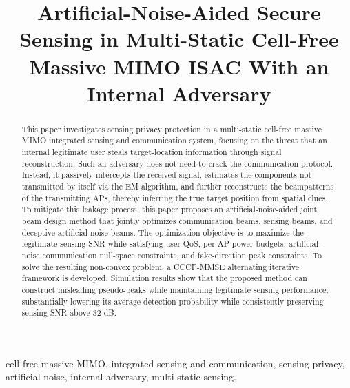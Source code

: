 \documentclass[conference,twocolumn,a4paper]{IEEEtran}
\title{Artificial-Noise-Aided Secure Sensing in Multi-Static Cell-Free Massive MIMO ISAC With an Internal Adversary}
\author{\IEEEauthorblockN{Author information to be inserted \verifytag}}
\begin{document}
\maketitle

\begin{abstract}
This paper investigates sensing privacy protection in a multi-static cell-free massive MIMO integrated sensing and communication system, focusing on the threat that an internal legitimate user steals target-location information through signal reconstruction. Such an adversary does not need to crack the communication protocol. Instead, it passively intercepts the received signal, estimates the components not transmitted by itself via the EM algorithm, and further reconstructs the beampatterns of the transmitting APs, thereby inferring the true target position from spatial clues. To mitigate this leakage process, this paper proposes an artificial-noise-aided joint beam design method that jointly optimizes communication beams, sensing beams, and deceptive artificial-noise beams. The optimization objective is to maximize the legitimate sensing SNR while satisfying user QoS, per-AP power budgets, artificial-noise communication null-space constraints, and fake-direction peak constraints. To solve the resulting non-convex problem, a CCCP-MMSE alternating iterative framework is developed.
 Simulation results show that the proposed method can construct misleading pseudo-peaks while maintaining legitimate sensing performance, 
 substantially lowering its average detection probability while consistently preserving sensing SNR above 32 dB.
\end{abstract}

\begin{IEEEkeywords}
cell-free massive MIMO, integrated sensing and communication, sensing privacy, artificial noise, internal adversary, multi-static sensing.
\end{IEEEkeywords}
\end{document}
